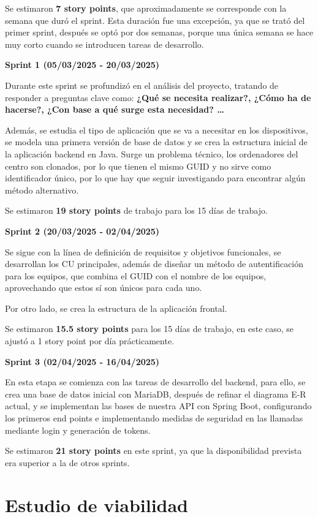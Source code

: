 Se estimaron  \textbf{7 story points}, que aproximadamente se corresponde con la semana que duró el sprint.
Esta duración fue una excepción, ya que se trató del primer sprint, después se optó por dos semanas, porque una única
semana se hace muy corto cuando se introducen tareas de desarrollo.

\textbf{Sprint 1 (05/03/2025 - 20/03/2025)}

Durante este sprint se profundizó en el análisis del proyecto, tratando de responder a preguntas clave como:
\textbf{¿Qué se necesita realizar?, ¿Cómo ha de hacerse?, ¿Con base a qué surge esta necesidad? \ldots}

Además, se estudia el tipo de aplicación que se va a necesitar en los dispositivos, se modela una primera versión de
base de datos y se crea la estructura inicial de la aplicación backend en Java.
Surge un problema técnico, los ordenadores del centro son clonados, por lo que tienen el mismo GUID y no sirve como
identificador único, por lo que hay que seguir investigando para encontrar algún método alternativo.

Se estimaron \textbf{19 story points} de trabajo para los 15 días de trabajo.


\textbf{Sprint 2 (20/03/2025 - 02/04/2025)}

Se sigue con la línea de definición de requisitos y objetivos funcionales, se desarrollan los CU principales, además de
diseñar un método de autentificación para los equipos, que combina el GUID con el nombre de los equipos, aprovechando
que estos sí son únicos para cada uno.

Por otro lado, se crea la estructura de la aplicación frontal.

Se estimaron \textbf{15.5 story points} para los 15 días de trabajo, en este caso, se ajustó a 1 story point por día prácticamente.


\textbf{Sprint 3 (02/04/2025 - 16/04/2025)}

En esta etapa se comienza con las tareas de desarrollo del backend, para ello, se crea una base de datos inicial
con MariaDB, después de refinar el diagrama E-R actual, y se implementan las bases de nuestra API con Spring Boot, configurando
los primeros end points e implementando medidas de seguridad en las llamadas mediante login y generación de tokens.

Se estimaron \textbf{21 story points} en este sprint, ya que la disponibilidad prevista era superior a la de otros sprints.

\section{Estudio de viabilidad}

